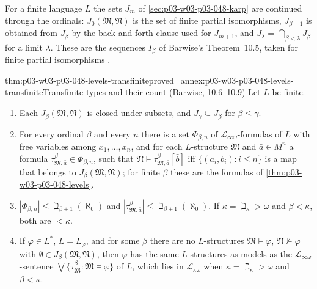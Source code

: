 For a finite language \(L\) the sets \(J_m\) of
\cref{sec:p03-w03-p03-048-karp} are continued through the ordinals:
\(J_0(\mathfrak M,\mathfrak N)\) is the set of finite partial isomorphisms,
\(J_{\beta+1}\) is obtained from \(J_\beta\) by the back and forth clause used
for \(J_{m+1}\), and \(J_\lambda=\bigcap_{\beta<\lambda}J_\beta\) for a limit
\(\lambda\).  These are the sequences \(I_\beta\) of Barwise's Theorem~10.5,
taken for finite partial isomorphisms \cite[p.~245]{Barwise1974Axioms}.

\begin{hblemma}{thm:p03-w03-p03-048-levels-transfinite}{proved=annex:p03-w03-p03-048-levels-transfinite}{Transfinite types and their count (Barwise, 10.6--10.9)}
Let \(L\) be finite.
\begin{enumerate}
\item Each \(J_\beta(\mathfrak M,\mathfrak N)\) is closed under subsets, and
      \(J_\gamma\subseteq J_\beta\) for \(\beta\leq\gamma\).
\item For every ordinal \(\beta\) and every \(n\) there is a set
      \(\Phi_{\beta,n}\) of \(\mathcal L_{\infty\omega}\)-formulas of \(L\)
      with free variables among \(x_1,\ldots,x_n\), and for each
      \(L\)-structure \(\mathfrak M\) and \(\bar a\in M^{n}\) a formula
      \(\tau^{\beta}_{\mathfrak M,\bar a}\in\Phi_{\beta,n}\), such that
      \(\mathfrak N\models\tau^{\beta}_{\mathfrak M,\bar a}[\bar b]\) iff
      \(\{(a_i,b_i):i\leq n\}\) is a map that belongs to
      \(J_\beta(\mathfrak M,\mathfrak N)\); for finite \(\beta\) these are the
      formulas of \cref{thm:p03-w03-p03-048-levels}.
\item \(|\Phi_{\beta,n}|\leq\beth_{\beta+1}(\aleph_0)\) and
      \(|\tau^{\beta}_{\mathfrak M,\bar a}|\leq\beth_{\beta+1}(\aleph_0)\).
      If \(\kappa=\beth_\kappa>\omega\) and \(\beta<\kappa\), both are
      \(<\kappa\).
\item If \(\varphi\in L^{\ast}\), \(L=L_\varphi\), and for some \(\beta\)
      there are no \(L\)-structures \(\mathfrak M\models\varphi\),
      \(\mathfrak N\not\models\varphi\) with \(\emptyset\in
      J_\beta(\mathfrak M,\mathfrak N)\), then \(\varphi\) has the same
      \(L\)-structures as models as the \(\mathcal L_{\infty\omega}\)-sentence
      \(\bigvee\{\tau^{\beta}_{\mathfrak M}:\mathfrak M\models\varphi\}\) of
      \(L\), which lies in \(\mathcal L_{\kappa\omega}\) when
      \(\kappa=\beth_\kappa>\omega\) and \(\beta<\kappa\).
\end{enumerate}
\end{hblemma}

